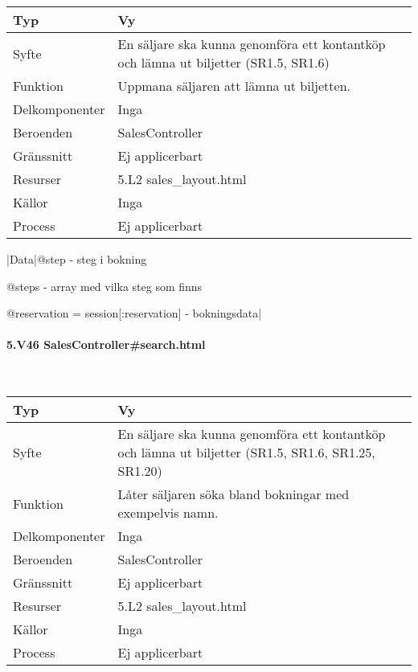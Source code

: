 \documentclass[a4paper, twoside, 11pt, titlepage]{article}
\begin{document}
			\begin {table} [ht] \begin{tabular} {  p{3.5cm} p{9.6cm} }
				\hline
				Typ & Vy  \\
				\hline
				Syfte & En säljare ska kunna genomföra ett kontantköp och lämna ut biljetter (SR1.5, SR1.6)  \\
				\hline
				Funktion & Uppmana säljaren att lämna ut biljetten.  \\
				\hline
				Delkomponenter & Inga  \\
				\hline
				Beroenden & SalesController  \\
				\hline
				Gränssnitt & Ej applicerbart  \\
				\hline
				Resurser & 5.L2 sales\_layout.html  \\
				\hline
				Källor & Inga  \\
				\hline
				Process & Ej applicerbart  \\
				\hline
			\end{tabular} \end{table} \FloatBarrier
			\vspace{6mm}

			|Data|@step - steg i bokning

			@steps - array med vilka steg som finns

			@reservation = session[:reservation] - bokningsdata|

			\paragraph{5.V46 SalesController\#search.html}\

			\begin {table} [ht] \begin{tabular} {  p{3.5cm} p{9.6cm} }
				\hline
				Typ & Vy  \\
				\hline
				Syfte & En säljare ska kunna genomföra ett kontantköp och lämna ut biljetter (SR1.5, SR1.6, SR1.25, SR1.20)  \\
				\hline
				Funktion & Låter säljaren söka bland bokningar med exempelvis namn.  \\
				\hline
				Delkomponenter & Inga  \\
				\hline
				Beroenden & SalesController  \\
				\hline
				Gränssnitt & Ej applicerbart  \\
				\hline
				Resurser & 5.L2 sales\_layout.html  \\
				\hline
				Källor & Inga  \\
				\hline
				Process & Ej applicerbart  \\
				\hline
			\end{tabular} \end{table} \FloatBarrier
			\vspace{6mm}
\end{document}
